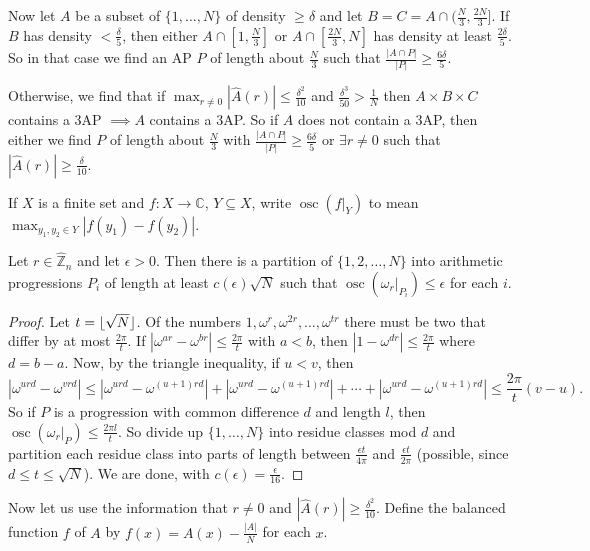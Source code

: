 \documentclass{article}
\newcommand{\1}[1]{\mathbbm{1}_{#1}}
\DeclarePairedDelimiter\floor{\lfloor}{\rfloor}
\DeclareMathOperator{\osc}{osc}
\begin{document}
Now let $A$ be a subset of $\{1, \dotsc, N\}$ of density $\geq \delta$ and let $B = C = A \cap (\frac{N}{3}, \frac{2N}{3}]$.
If $B$ has density $< \frac{\delta}{5}$, then either $A \cap [1, \frac{N}{3}]$ or $A \cap [\frac{2N}{3}, N]$ has density at least $\frac{2 \delta}{5}$.
So in that case we find an AP $P$ of length about $\frac{N}{3}$ such that $\frac{|A \cap P|}{|P|} \geq \frac{6 \delta}{5}$.

Otherwise, we find that if $\max_{r \neq 0} |\hat{A}(r)| \leq \frac{\delta^2}{10}$ and $\frac{\delta^3}{50} > \frac{1}{N}$ then $A \times B \times C$ contains a 3AP $\implies A$ contains a 3AP.
So if $A$ does not contain a 3AP, then either we find $P$ of length about $\frac{N}{3}$ with $\frac{|A \cap P|}{|P|} \geq \frac{6 \delta}{5}$ or $\exists r \neq 0$ such that $|\hat{A}(r)| \geq \frac{\delta}{10}$.

\begin{defi}
  If $X$ is a finite set and $f: X \to \mathbb{C}$, $Y \subseteq X$, write $\osc(f|_Y)$ to mean $\max_{y_1, y_2 \in Y} |f(y_1) - f(y_2)|$.
\end{defi}
\begin{nlemma}\label{lem:6}
  Let $r \in \hat{\mathbb{Z}}_n$ and let $\epsilon > 0$. Then there is a partition of $\{1,2,\dotsc,N\}$ into arithmetic progressions $P_i$ of length at least $c(\epsilon) \sqrt{N}$ such that $\osc(\omega_r|_{P_i}) \leq \epsilon$ for each $i$.
\end{nlemma}
\begin{proof}
  Let $t = \floor{\sqrt{N}}$. Of the numbers $1, \omega^r, \omega^{2r}, \dotsc, \omega^{tr}$ there must be two that differ by at most $\frac{2\pi}{t}$.
  If $|\omega^{ar} - \omega^{br}| \leq \frac{2\pi}{t}$ with $a < b$, then $|1 - \omega^{dr}| \leq \frac{2\pi}{t}$ where $d = b-a$.
  Now, by the triangle inequality, if $u < v$, then
  \begin{equation*}
    |\omega^{u rd} - \omega^{v r d}| \leq |\omega^{urd} - \omega^{(u+1) r d}| + |\omega^{urd} - \omega^{(u+1) r d}| + \dotsb + |\omega^{urd} - \omega^{(u+1) r d}| \leq \frac{2\pi}{t} (v-u).
  \end{equation*}
  So if $P$ is a progression with common difference $d$ and length $l$, then $\osc(\omega_r|_P) \leq \frac{2\pi l}{t}$.
  So divide up $\{1,\dotsc,N\}$ into residue classes mod $d$ and partition each residue class into parts of length between $\frac{\epsilon t}{4 \pi}$ and $\frac{\epsilon t}{2 \pi}$ (possible, since $d \leq t \leq \sqrt{N}$).
  We are done, with $c(\epsilon) = \frac{\epsilon}{16}$.
\end{proof}
Now let us use the information that $r \neq 0$ and $|\hat{A}(r)| \geq \frac{\delta^2}{10}$.
Define the balanced function $f$ of $A$ by $f(x) = A(x) - \frac{|A|}{N}$ for each $x$.
\end{document}

